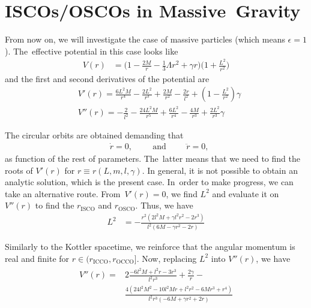 \documentclass[aps,amsmath,amssymb,twocolumn]{revtex4}
\begin{document}
\section{ISCOs/OSCOs in Massive~Gravity\label{sec5}}



From now on, we will investigate the case of massive particles (which means $\epsilon = 1$). The~effective potential in this case looks like
%
\begin{align}
V(r) &=  \bigg( 1 - \frac{2 M}{r} - \frac{1}{3} \Lambda  r^2
+ \gamma  r  \bigg) 
\bigg(
1 + \frac{L^2}{r^2}
\bigg)
\end{align}
%
and the first and second derivatives of the potential are
%
\begin{align}
&V'(r) =\frac{6 L^2 M}{r^4}  - \frac{2 L^2}{r^3} + \frac{2 M}{r^2}  -\frac{2 r}{l^2} +  \left(1-\frac{L^2}{r^2}\right)\gamma
\\
&V''(r) = -\frac{2}{l^2}-\frac{24 L^2 M}{r^5} + \frac{6 L^2}{r^4}-\frac{4 M}{r^3} + \frac{2 L^2}{r^3} \gamma
\end{align}
 
The circular orbits are obtained  demanding that
%
\begin{align}
&\dot{r} = 0,
\hspace{1cm} 
\text{and} 
\hspace{1cm}
\ddot{r}=0,
\end{align}
%
as function of the rest of parameters. The~latter means that we need to find the roots of $V'(r)$ for $r \equiv r(L,m,l,\gamma)$. 
In general, it is not possible to obtain an analytic solution, which is the present case. In~order to make progress, we can take an alternative route. From~$V'(r)=0$, we find $L^2$ and evaluate it on $V''(r)$ to find the $r_{\text{ISCO}}$ and $r_{\text{OSCO}}$. Thus, we have
%
\begin{align}
L^2 &= -\frac{r^2 \left(2 l^2 M + \gamma  l^2 r^2-2 r^3\right)}{l^2 \left(6 M-\gamma  r^2-2 r\right)}
\end{align}
 
Similarly to the Kottler spacetime, we reinforce that the angular momentum is real and finite for $r \in (r_{\text{ICCO}}, r_{\text{OCCO}}]$. Now, replacing $L^2$ into $V''(r)$, we have
%
\begin{align}
\begin{split}
V''(r) = &2\frac{-6 l^2 M+l^2 r-3 r^3}{l^2 r^3}+\frac{2\gamma }{r} -
\\
&
\frac{4 \left(24 l^2 M^2-10 l^2 M r+l^2 r^2-6 M r^3+r^4\right)}{l^2 r^3 \left(-6 M+\gamma  r^2+2 r\right)}
\end{split}
\end{align}
 
\end{document}
